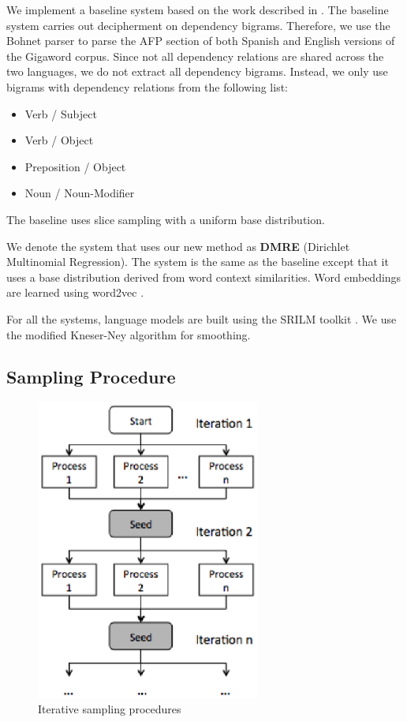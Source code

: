 We implement a baseline system based on the work described in . The baseline system carries out decipherment on dependency bigrams.  Therefore, we use the Bohnet parser \cite{bohnet:2010:PAPERS} to parse the AFP section of both Spanish and English versions of the Gigaword corpus. Since not all dependency relations are shared across the two languages, we do not extract all dependency bigrams. Instead, we only use bigrams with dependency relations from the following list: 

\begin{itemize}
\item Verb / Subject
\item Verb / Object
\item Preposition / Object
\item Noun / Noun-Modifier
\end{itemize}

The baseline uses slice sampling with a uniform base distribution.

We denote the system that uses our new method as \textbf{DMRE} (Dirichlet Multinomial Regression). The system is the same as the baseline except that it uses a base distribution derived from word context similarities.  Word embeddings are learned using word2vec \cite{mikolov2013efficient}.

For all the systems, language models are built using the SRILM toolkit \cite{srilm}. We use the modified Kneser-Ney \cite{KneserNey95} algorithm for smoothing.


\subsection{Sampling Procedure}
\label{sample_procedure}

 \begin{figure}[!ht]
  \centering
  \includegraphics[width=2.9in,height=3.9in]{iterative_sampling}
  \caption{Iterative sampling procedures}
\label{iterative_sampling}
\end{figure}

